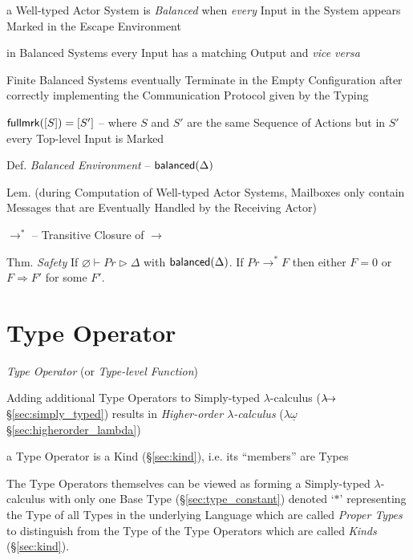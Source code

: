 a Well-typed Actor System is \emph{Balanced} when \emph{every} Input
in the System appears Marked in the Escape Environment

in Balanced Systems every Input has a matching Output and \emph{vice
  versa}

Finite Balanced Systems eventually Terminate in the Empty
Configuration after correctly implementing the Communication Protocol
given by the Typing


$\mathsf{fullmrk}([S]) = [S']$ -- where $S$ and $S'$ are the same Sequence of
Actions but in $S'$ every Top-level Input is Marked

Def. \emph{Balanced Environment} -- $\mathsf{balanced}(\Delta)$ %

Lem. (during Computation of Well-typed Actor Systems, Mailboxes only
contain Messages that are Eventually Handled by the Receiving Actor)

$\longrightarrow^*$ -- Transitive Closure of $\longrightarrow$

Thm. \emph{Safety} If $\varnothing \vdash Pr \rhd \Delta$ with
$\mathsf{balanced}(\Delta)$. If $Pr \longrightarrow^* F$ then either $F = 0$
or $F \Rightarrow F'$ for some $F'$.


\endgroup



\section{Type Operator}\label{sec:type_operator}

\emph{Type Operator} (or \emph{Type-level Function})

Adding additional Type Operators to Simply-typed $\lambda$-calculus
($\lambda\kern-5pt\rightarrow$ \S\ref{sec:simply_typed}) results in
\emph{Higher-order $\lambda$-calculus} ($\lambda\underline{\omega}$
\S\ref{sec:higherorder_lambda})

a Type Operator is a Kind (\S\ref{sec:kind}), i.e. its ``members'' are
Types

The Type Operators themselves can be viewed as forming a Simply-typed
$\lambda$-calculus with only one Base Type (\S\ref{sec:type_constant})
denoted `$\ast$' representing the Type of all Types in the underlying
Language which are called \emph{Proper Types} to distinguish from the
Type of the Type Operators which are called \emph{Kinds}
(\S\ref{sec:kind}).

